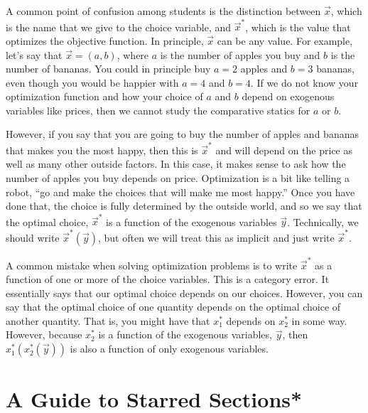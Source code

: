 A common point of confusion among students is the distinction between $\vec{x}$, which is the name that we give to the choice variable, and $\vec{x}^*$, which is the value that optimizes the objective function. In principle, $\vec{x}$ can be any value. For example, let's say that $\vec{x} = (a, b)$, where $a$ is the number of apples you buy and $b$ is the number of bananas. You could in principle buy $a = 2$ apples and $b = 3$ bananas, even though you would be happier with $a = 4$ and $b = 4$. If we do not know your optimization function and how your choice of $a$ and $b$ depend on exogenous variables like prices, then we cannot study the comparative statics for $a$ or $b$.


However, if you say that you are going to buy the number of apples and bananas that makes you the most happy, then this is $\vec{x}^*$ and will depend on the price as well as many other outside factors. In this case, it makes sense to ask how the number of apples you buy depends on price. Optimization is a bit like telling a robot, ``go and make the choices that will make me most happy.'' Once you have done that, the choice is fully determined by the outside world, and so we say that the optimal choice, $\vec{x}^*$ is a function of the exogenous variables $\vec{y}$. Technically, we should write $\vec{x}^*(\vec{y})$, but often we will treat this as implicit and just write $\vec{x}^*$.

A common mistake when solving optimization problems is to write $\vec{x}^*$ as a function of one or more of the choice variables. This is a category error. It essentially says that our optimal choice depends on our choices. However, you can say that the optimal choice of one quantity depends on the optimal choice of another quantity. That is, you might have that $x_1^*$ depends on $x_2^*$ in some way. However, because $x_2^*$ is a function of the exogenous variables, $\vec{y}$, then $x_1^*(x_2^*(\vec{y}))$ is also a function of only exogenous variables. 

\section{A Guide to Starred Sections*}

